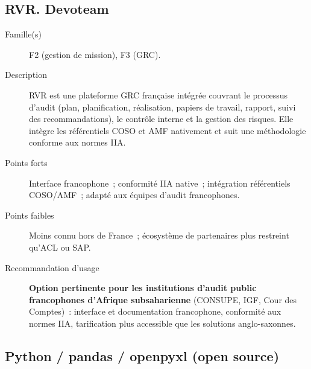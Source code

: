 \subsection*{RVR. Devoteam}

\begin{description}
  \item[Famille(s)] F2 (gestion de mission), F3 (GRC).
  \item[Description] RVR est une plateforme GRC française intégrée couvrant
        le processus d'audit (plan, planification, réalisation, papiers de
        travail, rapport, suivi des recommandations), le contrôle interne
        et la gestion des risques. Elle intègre les référentiels COSO et AMF
        nativement et suit une méthodologie conforme aux normes IIA.
  \item[Points forts] Interface francophone~; conformité IIA native~;
        intégration référentiels COSO/AMF~; adapté aux équipes d'audit
        francophones.
  \item[Points faibles] Moins connu hors de France~; écosystème de
        partenaires plus restreint qu'ACL ou SAP.
  \item[Recommandation d'usage] \textbf{Option pertinente pour les
        institutions d'audit public francophones d'Afrique subsaharienne}
        (CONSUPE, IGF, Cour des Comptes)~: interface et documentation
        francophone, conformité aux normes IIA, tarification plus accessible
        que les solutions anglo-saxonnes.
\end{description}

\subsection*{Python / pandas / openpyxl (open source)}

